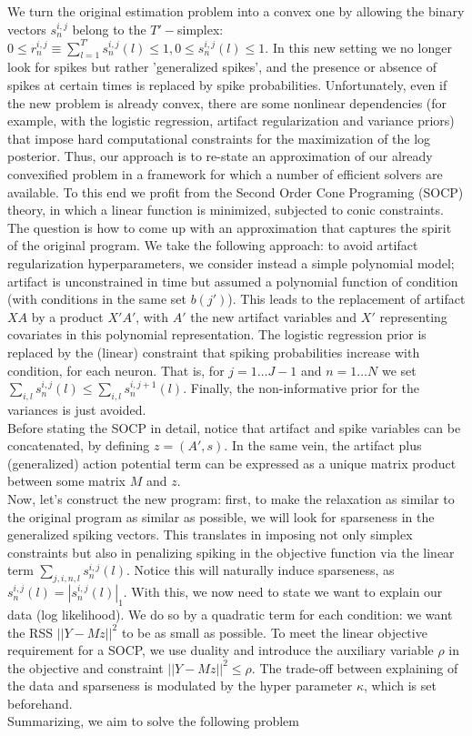 \documentclass[12pt,letterpaper,fleqn]{article}
\begin{document}
We turn the original estimation problem into a convex one by allowing the binary vectors $s_n^{i,j}$ belong to the $T'-$simplex: $0\leq r_n^{i,j}\equiv \sum_{l=1}^{T'} s_n^{i,j}(l)\leq 1, 0\leq s_n^{i,j}(l)\leq 1$. In this new setting we no longer look for spikes but rather 'generalized spikes', and the presence or absence of spikes at certain times is replaced by spike probabilities. Unfortunately, even if the new problem is already convex, there are some nonlinear dependencies (for example, with the logistic regression, artifact regularization and variance priors) that impose hard computational constraints for the maximization of the log posterior. Thus, our approach is to re-state an approximation of our already convexified problem in a framework for which a number of efficient solvers are available. To this end we profit from the Second Order Cone Programing (SOCP) theory, in which a linear function is minimized, subjected to conic constraints. The question is how to come up with an approximation that captures the spirit of the original program. We take the following approach: to avoid artifact regularization hyperparameters, we consider instead a simple polynomial model; artifact is unconstrained in time but assumed a polynomial function of condition (with conditions in the same set $b(j')$). This leads to the replacement of artifact  $XA$ by a product $X'A'$, with $A'$ the new artifact variables and $X'$ representing covariates in this polynomial representation. The logistic regression prior is replaced by the (linear) constraint that spiking probabilities increase with condition, for each neuron. That is, for $j=1\ldots J-1$ and $n=1\ldots N$ we set $\sum_{i,l}s_n^{i,j}(l) \leq \sum_{i,l}s_n^{i,j+1}(l)$. Finally, the non-informative prior for the variances is just avoided.\\
Before stating the SOCP in detail, notice that artifact and spike variables can be concatenated, by defining $z=(A',s)$. In the same vein, the artifact plus (generalized) action potential term can be expressed as a unique matrix product between some matrix $M$ and $z$. \\
Now, let's construct the new program: first, to make the relaxation as similar to the original program as similar as possible, we will look for sparseness in the generalized spiking vectors. This translates in imposing not only simplex constraints but also in penalizing spiking in the objective function via the linear term $\sum_{j,i,n,l} s_n^{i,j}(l)$. Notice this will naturally induce sparseness, as $s_n^{i,j}(l)=|s_n^{i,j}(l)|_1$.  With this, we now need to state we want to explain our data (log likelihood). We do so by a quadratic term for each condition: we want the RSS $||Y-Mz||^2$ to be as small as possible. To meet the linear objective requirement for a SOCP,  we use duality and introduce the auxiliary variable $\rho$ in the objective and constraint $||Y-Mz||^2\leq \rho$. The trade-off between explaining of the data and sparseness is modulated by the hyper parameter $\kappa$, which is set beforehand. \\Summarizing, we aim to solve the following problem
\end{document}
